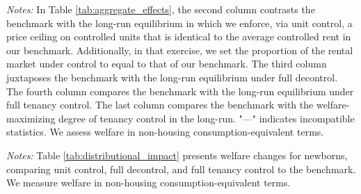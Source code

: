 \documentclass[parskip=full]{article}
\newenvironment{fignote2}[1]
{
\par
\medskip
\begin{minipage}{#1}
\footnotesize
}
{
\end{minipage}
}
\begin{document}
\begin{table}[H]
    \centering
    \caption{Aggregate effects generated by changes in rent control policy}
    \vspace{-0.5cm}
    \label{tab:aggregate_effects}
    
    \vspace{-0.45cm}
    \begin{fignote2}{1.1\textwidth}
      \textit{Notes:}  In Table \ref{tab:aggregate_effects}, the second column contrasts the benchmark with the long-run equilibrium in which we enforce, via unit control, a price ceiling on controlled units that is identical to the average controlled rent in our benchmark. Additionally, in that exercise, we set the proportion of the rental market under control to equal to that of our benchmark. The third column juxtaposes the benchmark with the long-run equilibrium under full decontrol. The fourth column compares the benchmark with the long-run equilibrium under full tenancy control. The last column compares the benchmark with the welfare-maximizing degree of tenancy control in the long-run. "—" indicates incompatible statistics. We assess welfare in non-housing consumption-equivalent terms.
    \end{fignote2}
\end{table}

\begin{table}[H]
    \centering
    \caption{Distributional impacts of rent control policy changes on newborns' welfare, broken down by income quintile ($\%\Delta$ in welfare).}
    \vspace{-0.5cm}
    \label{tab:distributional_impact}
    
    \vspace{-0.45cm}
    \begin{fignote2}{0.77\textwidth}
      \textit{Notes:} Table \ref{tab:distributional_impact} presents welfare changes for newborns, comparing unit control, full decontrol, and full tenancy control to the benchmark. We measure welfare in non-housing consumption-equivalent terms.
    \end{fignote2}
\end{table}
\end{document}
